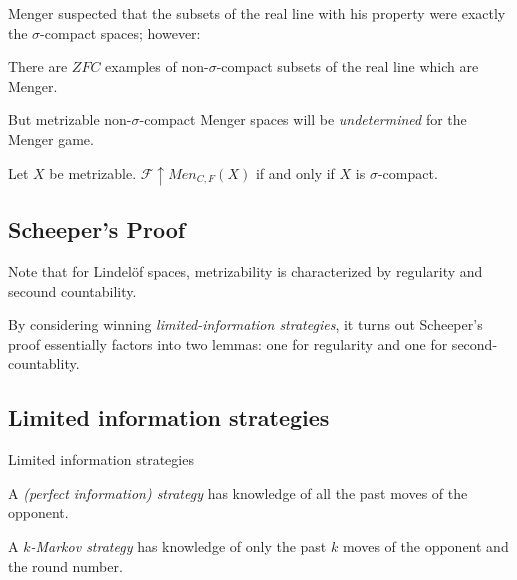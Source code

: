 \documentclass{beamer}
\theoremstyle{definition}
\newcommand{\win}{\uparrow}
\newcommand{\mengame}[1]{Men_{C,F}(#1)}
\newcommand{\<}{\langle}
\renewcommand{\>}{\rangle}
\newcommand{\pl}[1]{\mathscr{#1}}
\newcommand{\term}{\textit}
\begin{document}
\begin{frame}
  Menger suspected that the subsets of the real line with his property were
  exactly the $\sigma$-compact spaces; however:

  \pause

  \begin{theorem}
    There are $ZFC$ examples of non-$\sigma$-compact
    subsets of the real line which are Menger.
  \end{theorem}

  But metrizable non-$\sigma$-compact Menger spaces will be
  \term{undetermined} for the Menger game.

  \pause

  \begin{theorem}
    Let $X$ be metrizable. $\pl F\win\mengame X$ if and only if $X$ is
    $\sigma$-compact.
  \end{theorem}
\end{frame}

\subsection{Scheeper's Proof}

\begin{frame}
  Note that for Lindel\"of spaces, metrizability is characterized by regularity
  and secound countability.

  \vpause

  By considering winning \term{limited-information strategies}, it turns
  out Scheeper's proof essentially factors into two lemmas: one for regularity
  and one for second-countablity.
\end{frame}

\subsection{Limited information strategies}

\begin{frame}{Limited information strategies}
  \begin{definition}
    A \term{(perfect information) strategy} has knowledge of all the past
    moves of the opponent.
  \end{definition}

  \pause

  \begin{definition}
    A \term{$k$-Markov strategy} has knowledge of only the past $k$
    moves of the opponent and the round number.
  \end{definition}
\end{frame}
\end{document}
